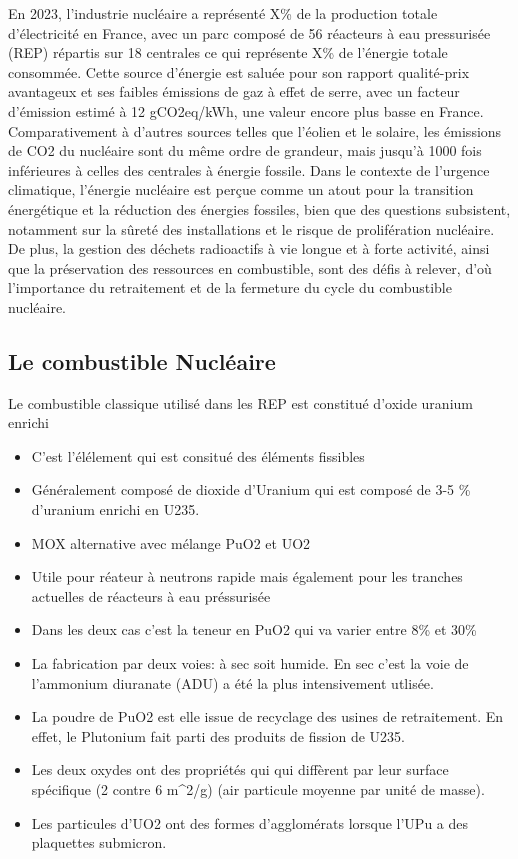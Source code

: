 En 2023, l'industrie nucléaire a représenté X\% de la production totale d'électricité en France, avec un parc composé de 56 réacteurs à eau pressurisée (REP) répartis sur 18 centrales ce qui représente X\% de l'énergie totale consommée. Cette source d'énergie est saluée pour son rapport qualité-prix avantageux et ses faibles émissions de gaz à effet de serre, avec un facteur d'émission estimé à 12 gCO2eq/kWh, une valeur encore plus basse en France. Comparativement à d'autres sources telles que l'éolien et le solaire, les émissions de CO2 du nucléaire sont du même ordre de grandeur, mais jusqu'à 1000 fois inférieures à celles des centrales à énergie fossile. Dans le contexte de l'urgence climatique, l'énergie nucléaire est perçue comme un atout pour la transition énergétique et la réduction des énergies fossiles, bien que des questions subsistent, notamment sur la sûreté des installations et le risque de prolifération nucléaire. De plus, la gestion des déchets radioactifs à vie longue et à forte activité, ainsi que la préservation des ressources en combustible, sont des défis à relever, d'où l'importance du retraitement et de la fermeture du cycle du combustible nucléaire.

\subsection{Le combustible Nucléaire}
Le combustible classique utilisé dans les REP est constitué d'oxide uranium enrichi


\begin{itemize}
    \item C'est l'élélement qui est consitué des éléments fissibles
    \item Généralement composé de dioxide d'Uranium qui est composé de 3-5 \% d'uranium enrichi en U235.
    \item MOX alternative avec mélange PuO2 et UO2
    \item Utile pour réateur à neutrons rapide mais également pour les tranches actuelles de réacteurs à eau préssurisée
    \item Dans les deux cas c'est la teneur en PuO2 qui va varier entre 8\% et 30\%
    \item La fabrication par deux voies: à sec soit humide. En sec c'est la voie de l'ammonium diuranate (ADU) a été la plus intensivement utlisée.
    \item La poudre de PuO2 est elle issue de recyclage des usines de retraitement. En effet, le Plutonium fait parti des produits de fission de U235.
    \item Les deux oxydes ont des propriétés qui qui diffèrent par leur surface spécifique (2 contre 6 m^2/g) (air particule moyenne par unité de masse).
    \item Les particules d'UO2 ont des formes d'agglomérats lorsque l'UPu a des plaquettes submicron.
\end{itemize}

